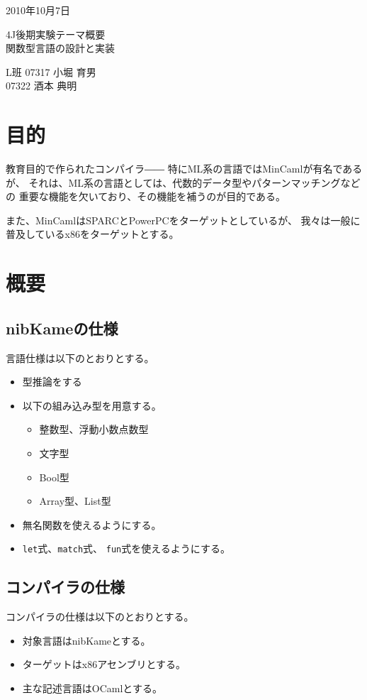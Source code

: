 \documentclass[a4paper, 10pt, oneside, notitlepage, onecolumn]{jsarticle}
\author{}
\begin{document}
\begin{flushright}
    2010年10月7日
\end{flushright}
\begin{center}
    4J後期実験テーマ概要\\
\hspace{0.1em}
    \textsc{\LARGE 関数型言語の設計と実装}
\end{center}
\begin{flushright}
    L班 07317 小堀 育男\\
        07322 酒本 典明
\end{flushright}
\section{目的}
    教育目的で作られたコンパイラ――
    特にML系の言語ではMinCamlが有名であるが、
    それは、ML系の言語としては、代数的データ型やパターンマッチングなどの
    重要な機能を欠いており、その機能を補うのが目的である。

    また、MinCamlはSPARCとPowerPCをターゲットとしているが、
    我々は一般に普及しているx86をターゲットとする。

\section{概要}
\subsection{nibKameの仕様}
    言語仕様は以下のとおりとする。
    \begin{itemize}
	    \item 型推論をする
	    \item 以下の組み込み型を用意する。
	    \begin{itemize}
	        \item 整数型、浮動小数点数型
	        \item 文字型
	        \item Bool型
	        \item Array型、List型
	    \end{itemize}
	    \item 無名関数を使えるようにする。
	    \item \texttt{let}式、\texttt{match}式、
	        \texttt{fun}式を使えるようにする。
    \end{itemize}

\subsection{コンパイラの仕様}
    コンパイラの仕様は以下のとおりとする。
    \begin{itemize}
        \item 対象言語はnibKameとする。
        \item ターゲットはx86アセンブリとする。
        \item 主な記述言語はOCamlとする。
    \end{itemize}
\end{document}

